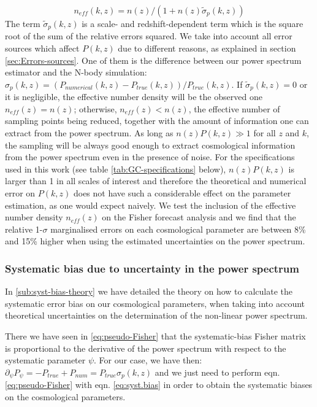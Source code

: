 \begin{equation}
n_{eff}(k,z)=n(z)/(1+n(z)\tilde{\sigma}_{p}(k,z))
\end{equation}
The term $\tilde{\sigma}_{p}(k,z)$ is a scale- and redshift-dependent
term which is the square root of the sum of the relative errors squared.
We take into account all error sources which affect $P(k,z)$ due
to different reasons, as explained in section \ref{sec:Errors-sources}.
One of them is the difference between our power spectrum estimator
and the N-body simulation: $\sigma_{p}(k,z)=(P_{numerical}(k,z)-P_{true}(k,z))/P_{true}(k,z)$.
If $\tilde{\sigma}_{p}(k,z)=0$ or it is negligible, the effective
number density will be the observed one $n_{eff}(z)=n(z)$; otherwise,
$n_{eff}(z)<n(z)$, the effective number of sampling points being
reduced, together with the amount of information one can extract from
the power spectrum. As long as $n(z)P(k,z)\gg1$ for all $z$ and
$k$, the sampling will be always good enough to extract cosmological
information from the power spectrum even in the presence of noise.
For the specifications used in this work (see table \ref{tab:GC-specifications}
below), $n(z)P(k,z)$ is larger than 1 in all scales of interest and
therefore the theoretical and numerical error on $P(k,z)$ does not
have such a considerable effect on the parameter estimation, as one
would expect naively. We test the inclusion of the effective number
density $n_{eff}(z)$ on the Fisher forecast analysis and we find
that the relative 1-$\sigma$ marginalised errors on each cosmological
parameter are between 8\% and 15\% higher when using the estimated
uncertainties on the power spectrum.


\subsubsection{Systematic bias due to uncertainty in the power spectrum \label{sub:syst-bias-nbodypk}}


In \cref{sub:syst-bias-theory} we have detailed the theory on how 
to calculate the systematic error bias on our cosmological parameters,
when taking into account theoretical uncertainties on the determination
of the non-linear power spectrum.

There we have seen in \cref{eq:pseudo-Fisher} that the systematic-bias Fisher matrix 
is proportional to the derivative of the power spectrum with respect to the systematic parameter $\psi$.
For our case, we have then:
\beeq$ \label{eq:pk-wrt-systpar}
\partial_{\psi}P_{\psi}=-P_{true}+P_{num}=P_{true}\sigma_{p}(k,z)
$
and we just need to perform eqn. \ref{eq:pseudo-Fisher} with eqn.
\ref{eq:syst.bias} in order to obtain the systematic biases on the
cosmological parameters.


